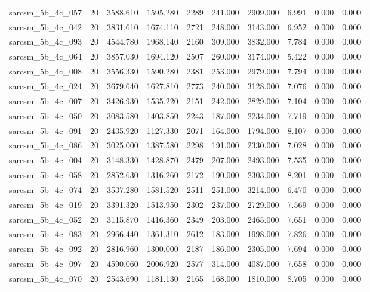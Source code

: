 \begin{tabular}{lrrrrrrrrr}
sarcsm\_5b\_4c\_057 & 20 & 3588.610 & 1595.280 & 2289 & 241.000 & 2909.000 & 6.991 & 0.000 & 0.000 \\
sarcsm\_5b\_4c\_042 & 20 & 3831.610 & 1674.110 & 2721 & 248.000 & 3143.000 & 6.952 & 0.000 & 0.000 \\
sarcsm\_5b\_4c\_093 & 20 & 4544.780 & 1968.140 & 2160 & 309.000 & 3832.000 & 7.784 & 0.000 & 0.000 \\
sarcsm\_5b\_4c\_064 & 20 & 3857.030 & 1694.120 & 2507 & 260.000 & 3174.000 & 5.422 & 0.000 & 0.000 \\
sarcsm\_5b\_4c\_008 & 20 & 3556.330 & 1590.280 & 2381 & 253.000 & 2979.000 & 7.794 & 0.000 & 0.000 \\
sarcsm\_5b\_4c\_024 & 20 & 3679.640 & 1627.810 & 2773 & 240.000 & 3128.000 & 7.076 & 0.000 & 0.000 \\
sarcsm\_5b\_4c\_007 & 20 & 3426.930 & 1535.220 & 2151 & 242.000 & 2829.000 & 7.104 & 0.000 & 0.000 \\
sarcsm\_5b\_4c\_050 & 20 & 3083.580 & 1403.850 & 2243 & 187.000 & 2234.000 & 7.719 & 0.000 & 0.000 \\
sarcsm\_5b\_4c\_091 & 20 & 2435.920 & 1127.330 & 2071 & 164.000 & 1794.000 & 8.107 & 0.000 & 0.000 \\
sarcsm\_5b\_4c\_086 & 20 & 3025.000 & 1387.580 & 2298 & 191.000 & 2330.000 & 7.028 & 0.000 & 0.000 \\
sarcsm\_5b\_4c\_004 & 20 & 3148.330 & 1428.870 & 2479 & 207.000 & 2493.000 & 7.535 & 0.000 & 0.000 \\
sarcsm\_5b\_4c\_058 & 20 & 2852.630 & 1316.260 & 2172 & 190.000 & 2303.000 & 8.201 & 0.000 & 0.000 \\
sarcsm\_5b\_4c\_074 & 20 & 3537.280 & 1581.520 & 2511 & 251.000 & 3214.000 & 6.470 & 0.000 & 0.000 \\
sarcsm\_5b\_4c\_019 & 20 & 3391.320 & 1513.950 & 2302 & 237.000 & 2729.000 & 7.569 & 0.000 & 0.000 \\
sarcsm\_5b\_4c\_052 & 20 & 3115.870 & 1416.360 & 2349 & 203.000 & 2465.000 & 7.651 & 0.000 & 0.000 \\
sarcsm\_5b\_4c\_083 & 20 & 2966.440 & 1361.310 & 2612 & 183.000 & 1998.000 & 7.826 & 0.000 & 0.000 \\
sarcsm\_5b\_4c\_092 & 20 & 2816.960 & 1300.000 & 2187 & 186.000 & 2305.000 & 7.694 & 0.000 & 0.000 \\
sarcsm\_5b\_4c\_097 & 20 & 4590.060 & 2006.920 & 2577 & 314.000 & 4087.000 & 7.658 & 0.000 & 0.000 \\
sarcsm\_5b\_4c\_070 & 20 & 2543.690 & 1181.130 & 2165 & 168.000 & 1810.000 & 8.705 & 0.000 & 0.000 \\

\end{tabular}
